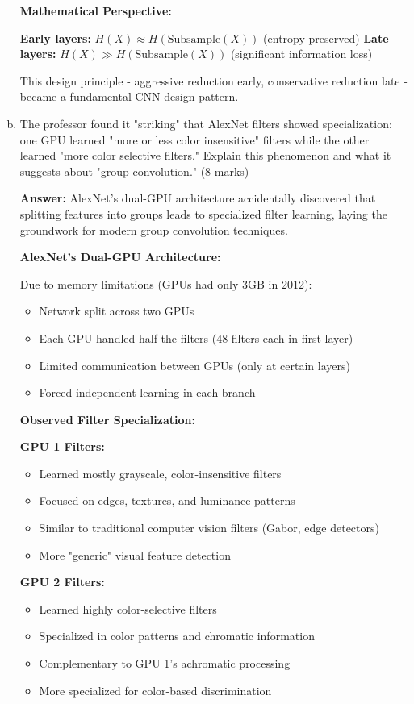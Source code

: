 \documentclass[12pt]{article}
\newcommand{\answer}[1]{{\color{answercolor}\textbf{Answer:} #1}}
\newcommand{\explanation}[1]{{\color{explanationcolor}#1}}
\begin{document}
\begin{enumerate}[(a)]
{    \textbf{Mathematical Perspective:}
    
    \textbf{Early layers:} $H(X) \approx H(\text{Subsample}(X))$ (entropy preserved)
    \textbf{Late layers:} $H(X) \gg H(\text{Subsample}(X))$ (significant information loss)
    
    This design principle - aggressive reduction early, conservative reduction late - became a fundamental CNN design pattern.
    }
    
    \item The professor found it "striking" that AlexNet filters showed specialization: one GPU learned "more or less color insensitive" filters while the other learned "more color selective filters." Explain this phenomenon and what it suggests about "group convolution." \hfill (8 marks)
    
    \answer{AlexNet's dual-GPU architecture accidentally discovered that splitting features into groups leads to specialized filter learning, laying the groundwork for modern group convolution techniques.}
    
    \explanation{
    \textbf{AlexNet's Dual-GPU Architecture:}
    
    Due to memory limitations (GPUs had only 3GB in 2012):
    \begin{itemize}
        \item Network split across two GPUs
        \item Each GPU handled half the filters (48 filters each in first layer)
        \item Limited communication between GPUs (only at certain layers)
        \item Forced independent learning in each branch
    \end{itemize}
    
    \textbf{Observed Filter Specialization:}
    
    \textbf{GPU 1 Filters:}
    \begin{itemize}
        \item Learned mostly grayscale, color-insensitive filters
        \item Focused on edges, textures, and luminance patterns
        \item Similar to traditional computer vision filters (Gabor, edge detectors)
        \item More "generic" visual feature detection
    \end{itemize}
    
    \textbf{GPU 2 Filters:}
    \begin{itemize}
        \item Learned highly color-selective filters
        \item Specialized in color patterns and chromatic information
        \item Complementary to GPU 1's achromatic processing
        \item More specialized for color-based discrimination
    \end{itemize}
    
}
\end{enumerate}
\end{document}

